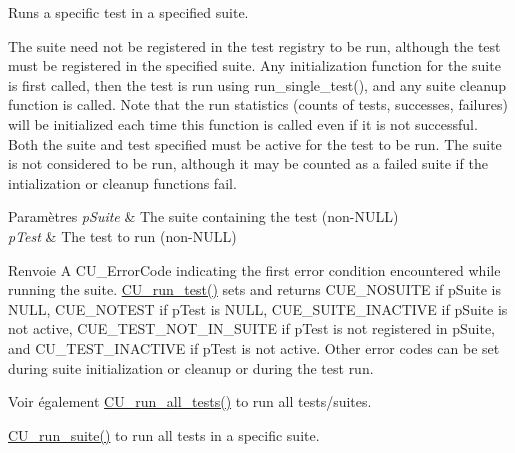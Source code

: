 Runs a specific test in a specified suite. 

The suite need not be registered in the test registry to be run, although the test must be registered in the specified suite. Any initialization function for the suite is first called, then the test is run using run\-\_\-single\-\_\-test(), and any suite cleanup function is called. Note that the run statistics (counts of tests, successes, failures) will be initialized each time this function is called even if it is not successful. Both the suite and test specified must be active for the test to be run. The suite is not considered to be run, although it may be counted as a failed suite if the intialization or cleanup functions fail.


\begin{DoxyParams}{Paramètres}
{\em p\-Suite} & The suite containing the test (non-\/\-N\-U\-L\-L) \\
\hline
{\em p\-Test} & The test to run (non-\/\-N\-U\-L\-L) \\
\hline
\end{DoxyParams}
\begin{DoxyReturn}{Renvoie}
A C\-U\-\_\-\-Error\-Code indicating the first error condition encountered while running the suite. \hyperlink{group__Framework_ga4469c032ef93be8169d4869b22ceabd1}{C\-U\-\_\-run\-\_\-test()} sets and returns C\-U\-E\-\_\-\-N\-O\-S\-U\-I\-T\-E if p\-Suite is N\-U\-L\-L, C\-U\-E\-\_\-\-N\-O\-T\-E\-S\-T if p\-Test is N\-U\-L\-L, C\-U\-E\-\_\-\-S\-U\-I\-T\-E\-\_\-\-I\-N\-A\-C\-T\-I\-V\-E if p\-Suite is not active, C\-U\-E\-\_\-\-T\-E\-S\-T\-\_\-\-N\-O\-T\-\_\-\-I\-N\-\_\-\-S\-U\-I\-T\-E if p\-Test is not registered in p\-Suite, and C\-U\-\_\-\-T\-E\-S\-T\-\_\-\-I\-N\-A\-C\-T\-I\-V\-E if p\-Test is not active. Other error codes can be set during suite initialization or cleanup or during the test run. 
\end{DoxyReturn}
\begin{DoxySeeAlso}{Voir également}
\hyperlink{group__Framework_gada41915e7f9ae386ecc1bed20a79300b}{C\-U\-\_\-run\-\_\-all\-\_\-tests()} to run all tests/suites. 

\hyperlink{group__Framework_ga765ad6b90ec25090288ec10d34fc15c0}{C\-U\-\_\-run\-\_\-suite()} to run all tests in a specific suite. 
\end{DoxySeeAlso}
